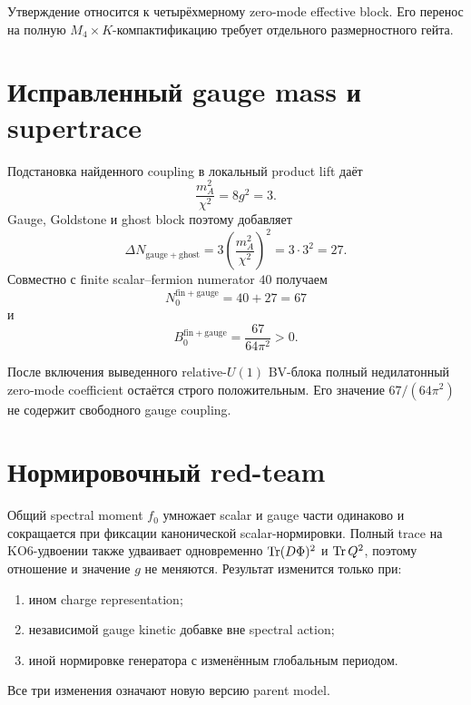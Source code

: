\begin{remark}
Утверждение относится к четырёхмерному zero-mode effective block.
Его перенос на полную \(M_4\times K\)-компактификацию требует отдельного
размерностного гейта.
\end{remark}

\section{Исправленный gauge mass и supertrace}

Подстановка найденного coupling в локальный product lift даёт
\begin{equation}
 \frac{m_A^2}{\chi^2}
 =8g^2=3.
\end{equation}
Gauge, Goldstone и ghost block поэтому добавляет
\begin{equation}
 \Delta N_{\mathrm{gauge+ghost}}
 =3\left(\frac{m_A^2}{\chi^2}\right)^2
 =3\cdot3^2=27.
\end{equation}
Совместно с finite scalar--fermion numerator \(40\) получаем
\begin{equation}
 N_0^{\mathrm{fin+gauge}}=40+27=67
\end{equation}
и
\begin{equation}
 \boxed{
 B_0^{\mathrm{fin+gauge}}
 =\frac{67}{64\pi^2}>0.}
\end{equation}

\begin{proposition}
После включения выведенного relative-\(U(1)\) BV-блока полный
недилатонный zero-mode coefficient остаётся строго положительным. Его
значение \(67/(64\pi^2)\) не содержит свободного gauge coupling.
\end{proposition}

\section{Нормировочный red-team}

Общий spectral moment \(f_0\) умножает scalar и gauge части одинаково и
сокращается при фиксации канонической scalar-нормировки. Полный trace на
KO6-удвоении также удваивает одновременно
\(\operatorname{Tr}(D\Phi)^2\) и \(\operatorname{Tr} Q^2\), поэтому отношение и значение \(g\) не
меняются. Результат изменится только при:
\begin{enumerate}
 \item ином charge representation;
 \item независимой gauge kinetic добавке вне spectral action;
 \item иной нормировке генератора с изменённым глобальным периодом.
\end{enumerate}
Все три изменения означают новую версию parent model.

